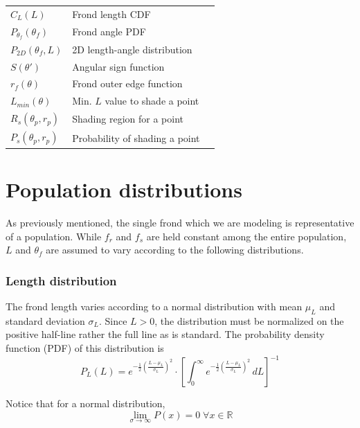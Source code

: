 \documentclass[10pt]{article}
\newenvironment{mcfig}
	{\par\medskip\noindent\minipage{\linewidth}}
	{\endminipage\par\medskip}
\begin{document}
\begin{multicols}{2}
\begin{mcfig}
\begin{tabular}{@{}llc@{}}
		$C_L(L)$                  & Frond length CDF                    & \\
		$P_{\theta_f}(\theta_f)$  & Frond angle PDF                     & \\
		$P_{2D}(\theta_f,L)$      & 2D length-angle distribution        & \\
		$S(\theta')$              & Angular sign function               & \\
		$r_f(\theta)$             & Frond outer edge function           & \\ 
		$L_{min}(\theta)$         & Min. $L$ value to shade a point     & \\
		$R_s(\theta_p,r_p)$       & Shading region for a point          & \\
		$P_s(\theta_p,r_p)$       & Probability of shading a point      & \\ \bottomrule
	\end{tabular}
	\label{fig:variables}
\end{mcfig}

\section{Population distributions}
\label{sec:distributions}
As previously mentioned, the single frond which we are modeling is representative of a population.
While $f_r$ and $f_s$ are held constant among the entire population, $L$ and $\theta_f$ are assumed to vary according to the following distributions.

\subsubsection{Length distribution}
\label{sec:length_dist}
The frond length varies according to a normal distribution with mean $\mu_L$ and standard deviation $\sigma_L$. Since $L>0$, the distribution must be normalized on the positive half-line rather the full line as is standard. The probability density function (PDF) of this distribution is
\begin{equation}
	P_L(L) = e^{-\frac{1}{2}\left(\frac{L-\mu_L}{\sigma_L}\right)^2}
	\cdot \left[ \int_0^\infty e^{-\frac{1}{2}\left(\frac{L-\mu_L}{\sigma_L}\right)^2}\,dL  \right] ^{-1}
\end{equation}

Notice that for a normal distribution,
\begin{equation}
	\displaystyle \lim_{\sigma \to \infty}P(x) = 0 \;\forall x \in \mathbb{R}
\end{equation}


\end{multicols}
\end{document}
